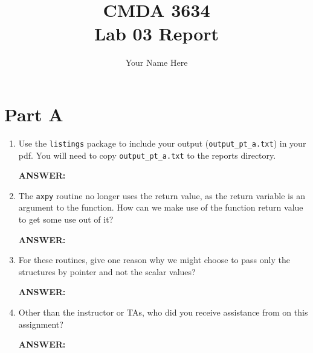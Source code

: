 \documentclass[letter]{article}
\title{CMDA 3634 \\ Lab 03 Report}
\author{Your Name Here}
\begin{document}
\maketitle

\section*{Part A}

\begin{enumerate}
    \item Use the \texttt{listings} package to include your output (\texttt{output\_pt\_a.txt}) in your pdf.  You will need to copy \texttt{output\_pt\_a.txt} to the reports directory.
    
    \textbf{ANSWER:} %


    \item The \texttt{axpy} routine no longer uses the return value, as the return variable is an argument to the function.  How can we make use of the function return value to get some use out of it?

    \textbf{ANSWER:} %

    \item For these routines, give one reason why we might choose to pass only the structures by pointer and not the scalar values?
    
    \textbf{ANSWER:} %

    \item Other than the instructor or TAs, who did you receive assistance from on this assignment?
    
    \textbf{ANSWER:} %
\end{enumerate}


% 



\end{document}
